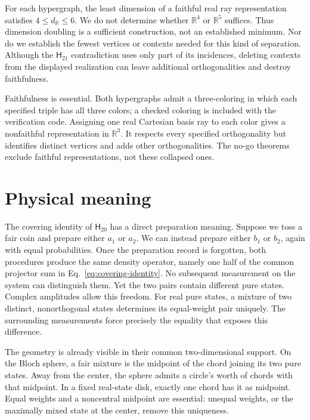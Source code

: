 \documentclass[twocolumn,aps,pra,floatfix,amsmath,amssymb,longbibliography]{revtex4-2}
\theoremstyle{definition}
\theoremstyle{remark}
\newcommand{\R}{\mathbb R}
\newcommand{\Htwenty}{\mathsf H_{20}}
\newcommand{\Htwentyone}{\mathsf H_{21}}
\begin{document}
For each hypergraph, the least dimension of a faithful real ray
representation satisfies $4\le d_{\R}\le6$.  We do not determine whether
$\R^4$ or $\R^5$ suffices.  Thus dimension doubling is a sufficient
construction, not an established minimum.  Nor do we establish the fewest
vertices or contexts needed for this kind of separation.  Although the
$\Htwentyone$ contradiction uses only part of its incidences, deleting
contexts from the displayed realization can leave additional
orthogonalities and destroy faithfulness.

Faithfulness is essential.  Both hypergraphs admit a three-coloring
in which each specified triple has all three colors; a checked coloring
is included with the verification code.  Assigning one real Cartesian
basis ray to each color gives a nonfaithful representation in $\R^3$.
It respects every specified orthogonality but identifies distinct vertices
and adds other orthogonalities.  The no-go theorems exclude faithful
representations, not these collapsed ones.

\section{Physical meaning}
\label{sec:physical}

The covering identity of $\Htwenty$ has a direct preparation meaning.
Suppose we toss a fair coin and prepare either $a_1$ or $a_2$.  We can
instead prepare either $b_1$ or $b_2$, again with equal probabilities.
Once the preparation record is forgotten, both procedures produce the
same density operator, namely one half of the common projector sum in
Eq.~\eqref{eq:covering-identity}.  No subsequent measurement on the system
can distinguish them.  Yet the two pairs contain different pure states.
Complex amplitudes allow this freedom.  For real pure states, a mixture
of two distinct, nonorthogonal states determines its equal-weight pair
uniquely.  The surrounding measurements force precisely the equality
that exposes this difference.

The geometry is already visible in their common two-dimensional support.
On the Bloch sphere, a fair mixture is the midpoint of the chord joining
its two pure states.  Away from the center, the sphere admits a circle's
worth of chords with that midpoint.  In a fixed real-state disk, exactly
one chord has it as midpoint.  Equal weights and a noncentral midpoint
are essential: unequal weights, or the maximally mixed state at the
center, remove this uniqueness.
\end{document}
